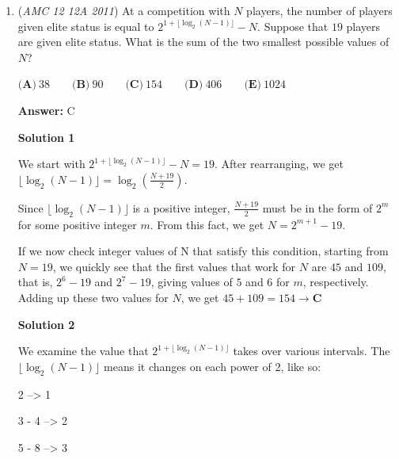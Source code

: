 \begin{enumerate}
 



\textbf{Solution 2}

Since the equation $|x+y|+|x-y| = 2$ is dealing with absolute values, the following could be deduced: $(x+y)+(x-y)=2$,$(x+y)-(x-y)=2$, $-(x+y)+(x-y)=2$, and $-(x+y)-(x-y)=2$. Simplifying would give $x=1$, $y=1$, $y=-1$, and $x=-1$. In $x^2-6x+y^2$, we care most about $-6x,$ since both $x^2$ and $y^2$ are non-negative. To maximize $-6x$, though, $x$ would have to be -1. Therefore, when $x=-1$ and $y=-1$ or $y=1$, the equation evaluates to $\boxed{\textbf{(D)}\ 8}$.

 


	\item (\textit{AMC 12 12A 2011}) At a competition with $N$ players, the number of players given elite status is equal to $2^{1+\lfloor \log_{2} (N-1) \rfloor}-N$. Suppose that $19$ players are given elite status. What is the sum of the two smallest possible values of $N$?


 $\textbf{(A)}\ 38 \qquad \textbf{(B)}\ 90 \qquad \textbf{(C)}\ 154 \qquad \textbf{(D)}\ 406 \qquad \textbf{(E)}\ 1024$

 \textbf{Answer: }C



\textbf{Solution 1}

We start with $2^{1+\lfloor\log_{2}(N-1)\rfloor}-N = 19$. After rearranging, we get $\lfloor\log_{2}(N-1)\rfloor = \log_{2} \left(\frac{N+19}{2}\right)$.

 Since $\lfloor\log_{2}(N-1)\rfloor$ is a positive integer, $\frac{N+19}{2}$ must be in the form of $2^{m}$ for some positive integer $m$. From this fact, we get $N=2^{m+1}-19$.

 If we now check integer values of N that satisfy this condition, starting from $N=19$, we quickly see that the first values that work for $N$ are $45$ and $109$, that is, $2^6-19$ and $2^7 -19$, giving values of $5$ and $6$ for $m$, respectively. Adding up these two values for $N$, we get $45 + 109 = 154 \rightarrow \boxed{\textbf{C}}$




\textbf{Solution 2}

We examine the value that $2^{1+\lfloor\log_{2}(N-1)\rfloor}$ takes over various intervals. The $\lfloor\log_{2}(N-1)\rfloor$ means it changes on each power of 2, like so:

 2 --> 1

 3 - 4 --> 2

 5 - 8 --> 3


\end{enumerate}

